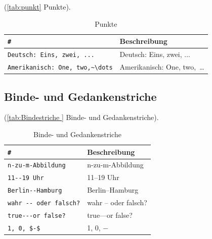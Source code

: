 (\autoref{tab:punkt} Punkte).
\begin{table}[!hb] %
	\centering
	\begin{tabular} {ll}
		\toprule %
			\verb|#| & \textbf{Beschreibung} \\
		\midrule
			\verb|Deutsch: Eins, zwei, ...| & Deutsch: Eins, zwei, ... \\
			\verb|Amerikanisch: One, two,~\dots| & Amerikanisch: One, two,~\dots \\
		\bottomrule
	\end{tabular}
		\caption{Punkte }	              %
		\label{tab:punkt}	              %
\end{table}

\subsection{Binde- und Gedankenstriche}\label{sec:Binde-Gedankenstriche}

(\autoref{tab:Bindestriche } Binde- und Gedankenstriche).
\begin{table}[!hb]%
	\centering
	\begin{tabular} {ll}
		\toprule %
			\verb|#| & \textbf{Beschreibung} \\
		\midrule
			\verb|n-zu-m-Abbildung| & n-zu-m-Abbildung \\
			\verb|11--19 Uhr| & 11--19 Uhr \\
			\verb|Berlin--Hamburg| & Berlin--Hamburg \\
			\verb|wahr -- oder falsch?| & wahr -- oder falsch? \\
			\verb|true---or false?| & true---or false? \\
			\verb|1, 0, $-$| & 1, 0, $-$ \\
		\bottomrule
	\end{tabular}
		\caption{Binde- und Gedankenstriche }%
		\label{tab:Bindestriche }	           %
\end{table}

